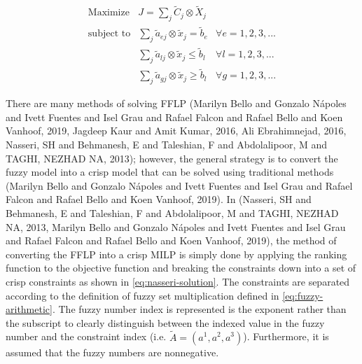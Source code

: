 \documentclass[11pt,a4paper,final]{article}
\begin{document}
\begin{equation}
\label{eq:general-fflp}
\begin{array}{lll}
\text{Maximize}   & J = \sum_j \tilde{C}_j \otimes \tilde{X}_j              &                 \\
\text{subject to} & \sum_j \tilde{a}_{ej} \otimes \tilde{x}_j = \tilde{b}_e &  \forall e = 1,2,3,... \\
                  & \sum_j \tilde{a}_{lj} \otimes \tilde{x}_j \le \tilde{b}_l &  \forall l = 1,2,3,... \\
                  & \sum_j \tilde{a}_{gj} \otimes \tilde{x}_j \ge \tilde{b}_l &  \forall g = 1,2,3,...
\end{array}
\end{equation}

There are many methods of solving FFLP
(Marilyn Bello and Gonzalo N{\'a}poles and Ivett Fuentes and Isel Grau and Rafael Falcon and Rafael Bello and Koen Vanhoof, 2019, Jagdeep Kaur and Amit Kumar, 2016, Ali Ebrahimnejad, 2016, Nasseri, SH and Behmanesh, E and Taleshian, F and Abdolalipoor, M and TAGHI, NEZHAD NA, 2013); however, the
general strategy is to convert the fuzzy model into a crisp model that can be solved using traditional methods
(Marilyn Bello and Gonzalo N{\'a}poles and Ivett Fuentes and Isel Grau and Rafael Falcon and Rafael Bello and Koen Vanhoof, 2019). In (Nasseri, SH and Behmanesh, E and Taleshian, F and Abdolalipoor, M and TAGHI, NEZHAD NA, 2013, Marilyn Bello and Gonzalo N{\'a}poles and Ivett Fuentes and Isel Grau and Rafael Falcon and Rafael Bello and Koen Vanhoof, 2019), the method of converting the FFLP
into a crisp MILP is simply done by applying the ranking function to the objective function and breaking the constraints
down into a set of crisp constraints as shown in \ref{eq:nasseri-solution}. The constraints are separated according to the
definition of fuzzy set multiplication defined in \ref{eq:fuzzy-arithmetic}. The fuzzy number index is represented is the
exponent rather than the subscript to clearly distinguish between the indexed value in the fuzzy number and the
constraint index (i.e. \(\tilde{A} = (a^1,a^2,a^3)\)). Furthermore, it is assumed that the fuzzy numbers are nonnegative.
\end{document}
